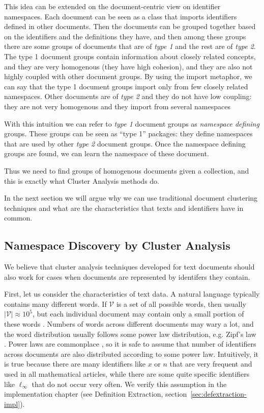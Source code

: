 This idea can be extended on the document-centric view on
identifier namespaces. Each document can be seen as a class that
imports identifiers defined in other documents.
Then the documents can be grouped together based on the identifiers
and the definitions they have, and then among these groups
there are some groups of documents that are of \emph{type 1}
and the rest are of \emph{type 2}. The type 1 document groups
contain information about closely related concepts, and they are
very homogenous (they have high cohesion), and they are also
not highly coupled with other document groups.
By using the import metaphor, we can say that the type 1 document groups
import only from few closely related namespaces.
Other documents are of \emph{type 2} and they do not have
low coupling: they are not very homogenous and they import from several namespaces

With this intuition we can refer to \emph{type 1} document groups
as \emph{namespace defining} groups. These groups can be seen as ``type 1''
packages: they define namespaces that are used by other \emph{type 2}
document groups. Once the namespace defining groups are found,
we can learn the namespace of these document.

Thus we need to find groups of homogenous documents given a
collection, and this is exactly what Cluster Analysis methods do.

In the next section we will argue why we can use traditional
document clustering techniques and what are the characteristics
that texts and identifiers have in common.


\subsection{Namespace Discovery by Cluster Analysis} \label{sec:clusters-namespaces}

We believe that cluster analysis techniques developed for text documents
should also work for cases when documents are represented by
identifers they contain.

First, let us consider the characteristics of text data.
A natural language typically contains many different words.
If $\mathcal V$ is a set of all possible words, then usually $|\mathcal V| \approx 10^5$,
but each individual document may contain only a small portion of these
words \cite{manning2008introduction}. Numbers of words across different
documents may wary a lot, and the word distribution usually
follows some power law distribution, e.g. Zipf's law \cite{manning2008introduction}.
Power laws are commonplace \cite{newman2005power}, so it is safe to assume
that number of identifiers across documents are also distributed according
to some power law. Intuitively, it is true because there are many identifiers
like $x$ or $n$ that are very frequent and used in all mathematical articles,
while there are some quite specific identifiers like $\ell_\infty$ that do
not occur very often. We verify this assumption in the implementation chapter
(see Definition Extraction, section~\ref{sec:defextraction-impl}).


